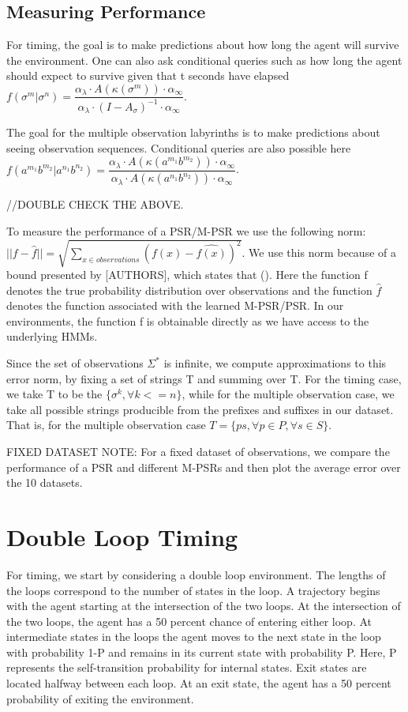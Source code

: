 \subsection{Measuring Performance}
For timing, the goal is to make predictions about how long the agent will survive the environment. One can also ask conditional queries such as how long the agent should expect to survive given that t seconds have elapsed $f(\sigma^m|\sigma^n) = \dfrac{\alpha_{\lambda} \cdot A(\kappa(\sigma^m)) \cdot \alpha_\infty}{\alpha_\lambda \cdot (I-A_{\sigma})^{-1} \cdot \alpha_{\infty} }$. 

The goal for the multiple observation labyrinths is to make predictions about seeing observation sequences. Conditional queries are also possible here $f(a^{m_1}b^{m_2}|a^{n_1}b^{n_2}) = \dfrac{\alpha_{\lambda} \cdot A(\kappa(a^{m_1}b^{m_2})) \cdot \alpha_\infty}{\alpha_\lambda \cdot A(\kappa(a^{n_1}b^{n_2})) \cdot \alpha_{\infty} }$.

//DOUBLE CHECK THE ABOVE.

To measure the performance of a PSR/M-PSR we use the following norm:
$||f - \hat{f}|| = \sqrt{\sum\nolimits_{x \in observations}(f(x) - \hat{f(x)})^2}$. We use this norm because of a bound presented by [AUTHORS], which states that (). Here the function f denotes the true probability distribution over observations and the function $\hat{f}$ denotes the function associated with the learned M-PSR/PSR. In our environments, the function f is obtainable directly as we have access to the underlying HMMs.

Since the set of observations $\Sigma^*$ is infinite, we compute approximations to this error norm, by fixing a set of strings T and summing over T. For the timing case, we take T to be the $\{\sigma^k, \forall k<=n\}$, while for the multiple observation case, we take all possible strings producible from the prefixes and suffixes in our dataset. That is, for the multiple observation case $T = \{ps, \forall p \in P, \forall s \in S\}$.

FIXED DATASET NOTE:
For a fixed dataset of observations, we compare the performance of a PSR and different M-PSRs and then plot the average error over the 10 datasets.

\section{Double Loop Timing}

For timing, we start by considering a double loop environment. The lengths of the loops correspond to the number of states in the loop. A trajectory begins with the agent starting at the intersection of the two loops. At the intersection of the two loops, the agent has a 50 percent chance of entering either loop. At intermediate states in the loops the agent moves to the next state in the loop with probability 1-P and remains in its current state with probability P. Here, P represents the self-transition probability for internal states. Exit states are located halfway between each loop. At an exit state, the agent has a 50 percent probability of exiting the environment. 

